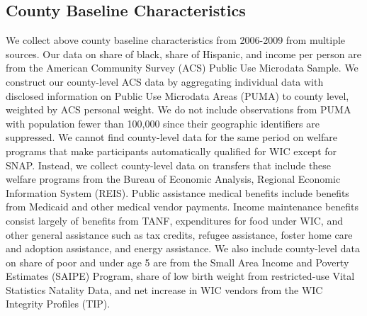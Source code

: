 \subsection{County Baseline Characteristics}
We collect above county baseline characteristics from 2006-2009 from multiple sources. Our data on share of black, share of Hispanic, and income per person are from the American Community Survey (ACS) Public Use Microdata Sample. We construct our county-level ACS data by aggregating individual data with disclosed information on Public Use Microdata Areas (PUMA) to county level, weighted by ACS personal weight. We do not include observations from PUMA with population fewer than 100,000 since their geographic identifiers are suppressed. We cannot find county-level data for the same period on welfare programs that make participants automatically qualified for WIC except for SNAP. Instead, we collect county-level data on transfers that include these welfare programs from the Bureau of Economic Analysis, Regional Economic Information System (REIS). Public assistance medical benefits include benefits from Medicaid and other medical vendor payments. Income maintenance benefits consist largely of benefits from TANF, expenditures for food under WIC, and other general assistance such as tax credits, refugee assistance, foster home care and adoption assistance, and energy assistance. We also include county-level data on share of poor and under age 5 are from the Small Area Income and Poverty Estimates (SAIPE) Program, share of low birth weight from restricted-use Vital Statistics Natality Data, and net increase in WIC vendors from the WIC Integrity Profiles (TIP).

